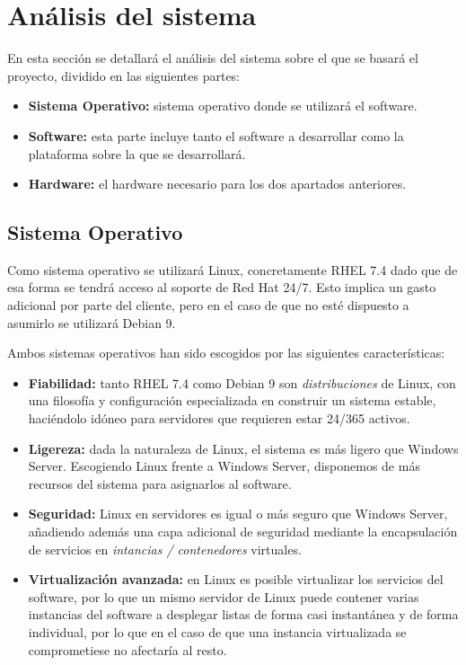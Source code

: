 \section{Análisis del sistema}
\par En esta sección se detallará el análisis del sistema sobre el que se basará el proyecto, dividido en las siguientes partes:
\begin{itemize}
	\item \textbf{Sistema Operativo:} sistema operativo donde se utilizará el software.
	\item \textbf{Software: }esta parte incluye tanto el software a desarrollar como la plataforma sobre la que se desarrollará.
	\item \textbf{Hardware: }el hardware necesario para los dos apartados anteriores. 
\end{itemize}

\subsection{Sistema Operativo}
\par Como sistema operativo se utilizará Linux, concretamente RHEL 7.4 dado que de esa forma se tendrá acceso al soporte de Red Hat 24/7. Esto implica un gasto adicional por parte del cliente, pero en el caso de que no esté dispuesto a asumirlo se utilizará Debian 9.
\par Ambos sistemas operativos han sido escogidos por las siguientes características:
\begin{itemize}
	\item \textbf{Fiabilidad:} tanto RHEL 7.4 como Debian 9 son \textit{distribuciones} de Linux, con una filosofía y configuración especializada en construir un sistema estable, haciéndolo idóneo para servidores que requieren estar 24/365 activos.
	\item \textbf{Ligereza:} dada la naturaleza de Linux, el sistema es más ligero que Windows Server. Escogiendo Linux frente a Windows Server, disponemos de más recursos del sistema para asignarlos al software.
	\item \textbf{Seguridad:} Linux en servidores es igual o más seguro que Windows Server, añadiendo además una capa adicional de seguridad mediante la encapsulación de servicios en \textit{intancias / contenedores} virtuales.
	\item \textbf{Virtualización avanzada:} en Linux es posible virtualizar los servicios del software, por lo que un mismo servidor de Linux puede contener varias instancias del software a desplegar listas de forma casi instantánea y de forma individual, por lo que en el caso de que una instancia virtualizada se comprometiese no afectaría al resto.
\end{itemize}
